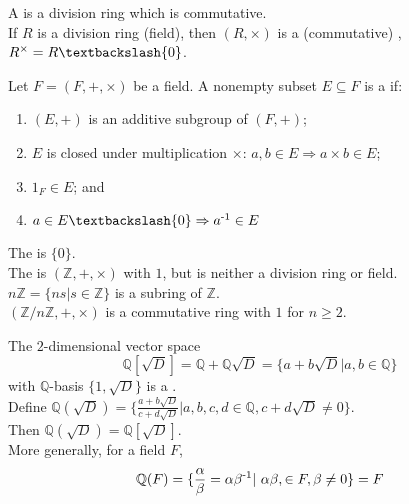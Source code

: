 \begin{definition}
A  is a division ring which is commutative.\\
If $R$ is a division ring (field), then $(R, \times)$ is a (commutative) , $R^\times = R \textbackslash \{0\}$.\\
\end{definition}


\begin{definition}
Let $F = (F, +, \times) $ be a field. A nonempty subset $E \subseteq F$ is a  if:
\begin{enumerate}[label=(\roman*)]
\item $(E, +)$ is an additive subgroup of $(F, +)$;
\item $E$ is closed under multiplication $\times$: $a, b \in E \Rightarrow a \times b \in E$;
\item $1_F \in E$; and
\item $a \in E \textbackslash \{0\} \Rightarrow a \textsuperscript{-1} \in E$
\end{enumerate}
\end{definition}


\begin{remark}
The  is $\{0\}$.\\
The  is $(\mathbb{Z}, +, \times )$ with $ 1 $, but is neither a division ring or field.\\
$n \mathbb{Z} = \{ns | s \in \mathbb{Z}\} $ is a subring of $\mathbb{Z}$.\\
$(\mathbb{Z} / n \mathbb{Z}, +, \times) $ is a commutative ring with $ 1 $ for $ n \geq 2 $.\\
\end{remark}


\begin{remark}
The $2$-dimensional vector space 
\begin{equation}
\mathbb{Q}[\sqrt{D}] = \mathbb{Q} + \mathbb{Q}\sqrt{D} = \{a+b\sqrt{D}|a, b \in \mathbb{Q} \}
\nonumber
\end{equation}
with $\mathbb{Q}$-basis $\{1, \sqrt{D} \}$ is a .\\
Define $\mathbb{Q}(\sqrt{D}) = \{ \frac{ a+b\sqrt{D} }{ c+d\sqrt{D} } | a, b, c, d \in \mathbb{Q}, c + d\sqrt{D} \neq 0 \} $. \\
Then $\mathbb{Q}(\sqrt{D}) = \mathbb{Q}[\sqrt{D}]$.\\
More generally, for a field $F$, 
\begin{equation}
\mathbb{Q}(F) = \{\frac{\alpha}{\beta} = \alpha \beta \textsuperscript{-1} |\ \alpha \beta , \in F, \beta \neq 0\} = F
\nonumber
\end{equation}
\end{remark}


